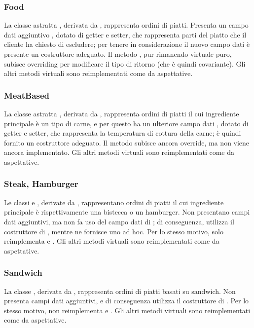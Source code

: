 \subsubsection{Food} %
\label{ssub:food}
La classe astratta , derivata da , rappresenta ordini di piatti. Presenta un campo dati aggiuntivo , dotato di getter e setter, che rappresenta parti del piatto che il cliente ha chiesto di escludere; per tenere in considerazione il nuovo campo dati è presente un costruttore adeguato. Il metodo , pur rimanendo virtuale puro, subisce overriding per modificare il tipo di ritorno (che è quindi covariante). Gli altri metodi virtuali sono reimplementati come da aspettative.
\subsubsection{MeatBased} %
\label{ssub:meatbased}
La classe astratta , derivata da , rappresenta ordini di piatti il cui ingrediente principale è un tipo di carne, e per questo ha un ulteriore campo dati , dotato di getter e setter, che rappresenta la temperatura di cottura della carne; è quindi fornito un costruttore adeguato. Il metodo  subisce ancora override, ma non viene ancora implementato. Gli altri metodi virtuali sono reimplementati come da aspettative.
\subsubsection{Steak, Hamburger} %
\label{ssub:steak_hamburger}
Le classi  e , derivate da , rappresentano ordini di piatti il cui ingrediente principale è rispettivamente una bistecca o un hamburger. Non presentano campi dati aggiuntivi, ma  non fa uso del campo dati  di ; di conseguenza,  utilizza il costruttore di , mentre  ne fornisce uno ad hoc. Per lo stesso motivo, solo  reimplementa  e . Gli altri metodi virtuali sono reimplementati come da aspettative.
\subsubsection{Sandwich} %
\label{ssub:sandwich}
La classe , derivata da , rappresenta ordini di piatti basati su sandwich. Non presenta campi dati aggiuntivi, e di conseguenza utilizza il costruttore di . Per lo stesso motivo, non reimplementa  e . Gli altri metodi virtuali sono reimplementati come da aspettative.
